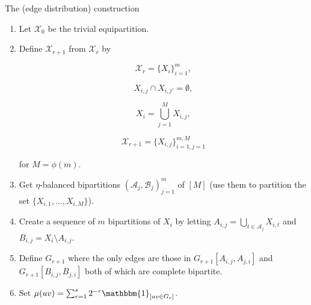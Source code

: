 \documentclass{beamer}
\newcommand{\1}{\mathbbm{1}}
\newcommand{\X}{\mathcal{X}}
\newcommand{\A}{\mathcal{A}}
\newcommand{\B}{\mathcal{B}}
\newcommand{\indicator}[1]{\1_{[#1]}}
\begin{document}
\begin{frame}{The (edge distribution) construction}
  \begin{enumerate}
    \item[] Let $\X_0$ be the trivial equipartition.
          \pause
    \item Define $\X_{r + 1}$ from $\X_r$ by
          \vspace{-25pt}
          \begin{multicols}{2}
            \begin{equation*}
              \X_r = \{ X_i \}_{i = 1}^m,
            \end{equation*}

            \begin{equation*}
              X_{i, j} \cap X_{i, j'} = \emptyset,
            \end{equation*}

            \begin{equation*}
              X_i = \bigcup_{j = 1}^M X_{i, j},
            \end{equation*}

            \begin{equation*}
              \X_{r + 1} = \{ X_{i, j} \}_{i = 1, j = 1}^{m, M}
            \end{equation*}
          \end{multicols}
          for $M = \phi(m)$.

          \pause

    \item Get $\eta$-balanced bipartitions $(\A_j, \B_j)_{j = 1}^m$ of $[M]$ (use them
          to partition the set $\{X_{i, 1}, \dots, X_{i, M}\}$).

          \pause

    \item Create a sequence of $m$ bipartitions of $X_i$ by letting $A_{i, j} =
            \bigcup_{t \in \A_j} X_{i, t}$ and $B_{i, j} = X_i \setminus A_{i, j}$.

          \pause

    \item Define $G_{r + 1}$ where the only edges are those in
          $G_{r + 1}[A_{i, j}, A_{j, i}]$ and $G_{r + 1}[B_{i, j}, B_{j, i}]$ both of
          which are complete bipartite.
          \pause
    \item Set $\mu(uv) = \sum_{r = 1}^s 2^{-r} \indicator{uv \in G_r}$.
  \end{enumerate}

\end{frame}
\end{document}
